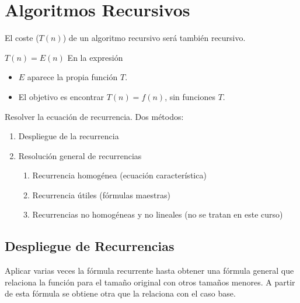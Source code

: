 \section{Algoritmos Recursivos}\label{sec:algoritmos-recursivos}

El coste ($T(n)$) de un algoritmo recursivo será también recursivo.

$T(n)= E(n)$ En la expresión
\begin{itemize}
	\item $E$ aparece la propia función $T$.
	\item El objetivo es encontrar $T(n)= f(n)$, sin funciones $T$.
\end{itemize}

Resolver la ecuación de recurrencia. Dos métodos:
\begin{enumerate}
	\item Despliegue de la recurrencia
	\item Resolución general de recurrencias
	      \begin{enumerate}
		      \item Recurrencia homogénea (ecuación característica)
		      \item Recurrencia útiles (fórmulas maestras)
		      \item Recurrencias no homogéneas y no lineales (no se tratan en este curso)
	      \end{enumerate}

\end{enumerate}

\subsection{Despliegue de Recurrencias}
Aplicar varias veces la fórmula recurrente hasta obtener una fórmula general que relaciona la función para el tamaño original con otros tamaños menores. A partir de esta fórmula se obtiene otra que la relaciona con el caso base.

